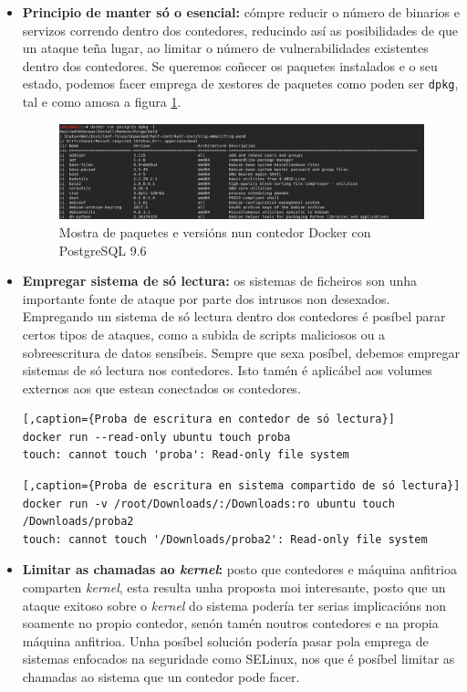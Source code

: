 \begin{itemize}
    \item \textbf{Principio de manter só o esencial:} cómpre reducir o número de binarios e servizos correndo dentro dos contedores, reducindo así as posibilidades de que un ataque teña lugar, ao limitar o número de vulnerabilidades existentes dentro dos contedores. Se queremos coñecer os paquetes instalados e o seu estado, podemos facer emprega de xestores de paquetes como poden ser {\tt dpkg}, tal e como amosa a figura \ref{dpkgl}.
    
    \begin{figure}
    \centerline{\includegraphics[width=15cm]{figuras/dpkgl.png}}
    \caption{Mostra de paquetes e versións nun contedor Docker con PostgreSQL 9.6}
    \label{dpkgl}
    \end{figure}
    
    \item \textbf{Empregar sistema de só lectura:} os sistemas de ficheiros son unha importante fonte de ataque por parte dos intrusos non desexados. Empregando un sistema de só lectura dentro dos contedores é posíbel parar certos tipos de ataques, como a subida de scripts maliciosos ou a sobreescritura de datos sensíbeis. Sempre que sexa posíbel, debemos empregar sistemas de só lectura nos contedores. Isto tamén é aplicábel aos volumes externos aos que estean conectados os contedores.
    
    \begin{lstlisting}[,caption={Proba de escritura en contedor de só lectura}]
docker run --read-only ubuntu touch proba
touch: cannot touch 'proba': Read-only file system
    \end{lstlisting}
    
    \begin{lstlisting}[,caption={Proba de escritura en sistema compartido de só lectura}]
docker run -v /root/Downloads/:/Downloads:ro ubuntu touch /Downloads/proba2
touch: cannot touch '/Downloads/proba2': Read-only file system
    \end{lstlisting}
    
    \item \textbf{Limitar as chamadas ao \textit{kernel}:} posto que contedores e máquina anfitrioa comparten \textit{kernel}, esta resulta unha proposta moi interesante, posto que un ataque exitoso sobre o \textit{kernel} do sistema podería ter serias implicacións non soamente no propio contedor, senón tamén noutros contedores e na propia máquina anfitrioa. Unha posíbel solución podería pasar pola emprega de sistemas enfocados na seguridade como \gls{SELinux}, nos que é posíbel limitar as chamadas ao sistema que un contedor pode facer.
    

\end{itemize}
